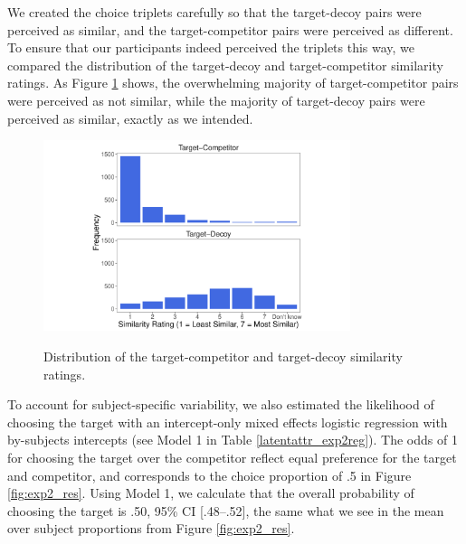 \documentclass[12pt, a4paper]{article}
\begin{document}
We created the choice triplets carefully so that the target-decoy pairs were perceived as similar, and the target-competitor pairs were perceived as different. To ensure that our participants indeed perceived the triplets this way, we compared the distribution of the target-decoy and target-competitor similarity ratings. As Figure \ref{fig:exp2_similarityratings} shows, the overwhelming majority of target-competitor pairs were perceived as not similar, while the majority of target-decoy pairs were perceived as similar, exactly as we intended.

\begin{figure}[htb!]
\centering
		\caption{Distribution of the target-competitor and target-decoy similarity ratings.}
\includegraphics[width=0.8\textwidth]{Figure5.pdf}
\label{fig:exp2_similarityratings}
\end{figure}


To account for subject-specific variability, we also estimated the likelihood of choosing the target with an intercept-only mixed effects logistic regression with by-subjects intercepts (see Model 1 in Table \ref{latentattr_exp2reg}). The odds of 1 for choosing the target over the competitor reflect equal preference for the target and competitor, and corresponds to the choice proportion of .5 in Figure \ref{fig:exp2_res}. Using Model 1, we calculate that the overall probability of choosing the target is .50, 95\% CI [.48--.52], the same what we see in the mean over subject proportions from Figure \ref{fig:exp2_res}.
\end{document}
